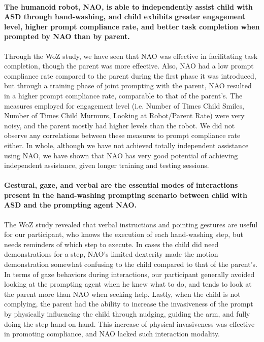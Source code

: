 \documentclass{ut-thesis}
\begin{document}
\paragraph{The humanoid robot, NAO, is able to independently assist child with ASD through hand-washing, and child exhibits greater engagement level, higher prompt compliance rate, and better task completion when prompted by NAO than by parent.}
Through the WoZ study, we have seen that NAO was effective in facilitating task completion, though the parent was more effective.  Also, NAO had a low prompt compliance rate compared to the parent during the first phase it was introduced, but through a training phase of joint prompting with the parent, NAO resulted in a higher prompt compliance rate, comparable to that of the parent's.  The measures employed for engagement level (i.e. Number of Times Child Smiles, Number of Times Child Murmurs, Looking at Robot/Parent Rate) were very noisy, and the parent mostly had higher levels than the robot.  We did not observe any correlations between these measures to prompt compliance rate either.  In whole, although we have not achieved totally independent assistance using NAO, we have shown that NAO has very good potential of achieving independent assistance, given longer training and testing sessions.

\paragraph{Gestural, gaze, and verbal are the essential modes of interactions present in the hand-washing prompting scenario between child with ASD and the prompting agent NAO.}
The WoZ study revealed that verbal instructions and pointing gestures are useful for our participant, who knows the execution of each hand-washing step, but needs reminders of which step to execute.  In cases the child did need demonstrations for a step, NAO's limited dexterity made the motion demonstration somewhat confusing to the child compared to that of the parent's.  In terms of gaze behaviors during interactions, our participant generally avoided looking at the prompting agent when he knew what to do, and tends to look at the parent more than NAO when seeking help.  Lastly, when the child is not complying, the parent had the ability to increase the invasiveness of the prompt by physically influencing the child through nudging, guiding the arm, and fully doing the step hand-on-hand.  This increase of physical invasiveness was effective in promoting compliance, and NAO lacked such interaction modality.
\end{document}
